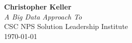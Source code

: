 \begin{titlepage}
    \vspace*{\fill}
    \begin{center}
        \textbf{\Large Christopher Keller}\\[1cm]
        \textit{A Big Data Approach To \climatedge}\\ [.5cm]
         CSC NPS Solution Leadership Institute\\ [.5cm]
        \today
    \end{center}
    \vspace*{\fill}
\end{titlepage}
